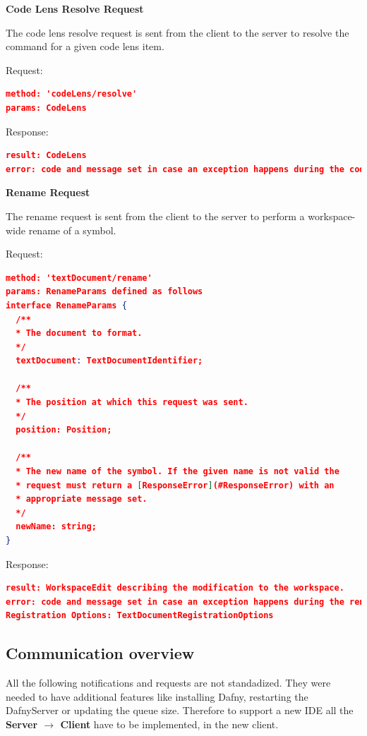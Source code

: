 \textbf{Code Lens Resolve Request}

The code lens resolve request is sent from the client to the server to resolve the command for a given code lens item.

Request:
\begin{lstlisting}[language=json,firstnumber=1]
method: 'codeLens/resolve'
params: CodeLens
\end{lstlisting}

Response:
\begin{lstlisting}[language=json,firstnumber=1]
result: CodeLens
error: code and message set in case an exception happens during the code lens resolve request.
\end{lstlisting}

\textbf{Rename Request}

The rename request is sent from the client to the server to perform a workspace-wide rename of a symbol.

Request:
\begin{lstlisting}[language=json,firstnumber=1]
method: 'textDocument/rename'
params: RenameParams defined as follows
interface RenameParams {
  /**
  * The document to format.
  */
  textDocument: TextDocumentIdentifier;

  /**
  * The position at which this request was sent.
  */
  position: Position;

  /**
  * The new name of the symbol. If the given name is not valid the
  * request must return a [ResponseError](#ResponseError) with an
  * appropriate message set.
  */
  newName: string;
}
\end{lstlisting}
Response:
\begin{lstlisting}[language=json,firstnumber=1]
result: WorkspaceEdit describing the modification to the workspace.
error: code and message set in case an exception happens during the rename request.
Registration Options: TextDocumentRegistrationOptions
\end{lstlisting}

\subsection{Communication overview}\label{custom commands}
All the following notifications and requests are not standadized. They were needed to have additional features like installing Dafny, restarting the DafnyServer or updating the queue size. 
Therefore to support a new IDE all the \textbf{Server $\longrightarrow$ Client} have to be implemented, in the new client.


